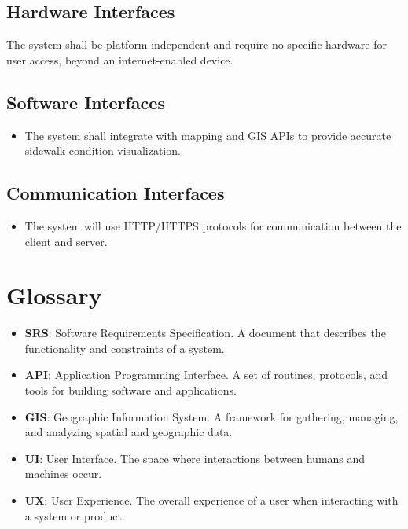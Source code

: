 \documentclass[a4paper,12pt]{article}
\begin{document}
\subsection{Hardware Interfaces}
The system shall be platform-independent and require no specific hardware for user access, beyond an internet-enabled device.

\subsection{Software Interfaces}
\begin{itemize}
    \item The system shall integrate with mapping and GIS APIs to provide accurate sidewalk condition visualization.
\end{itemize}

\subsection{Communication Interfaces}
\begin{itemize}
    \item The system will use HTTP/HTTPS protocols for communication between the client and server.
\end{itemize}

\section{Glossary}

\begin{itemize}
    \item \textbf{SRS}: Software Requirements Specification. A document that describes the functionality and constraints of a system.
    \item \textbf{API}: Application Programming Interface. A set of routines, protocols, and tools for building software and applications.
    \item \textbf{GIS}: Geographic Information System. A framework for gathering, managing, and analyzing spatial and geographic data.
    \item \textbf{UI}: User Interface. The space where interactions between humans and machines occur.
    \item \textbf{UX}: User Experience. The overall experience of a user when interacting with a system or product.
\end{itemize}
\end{document}
